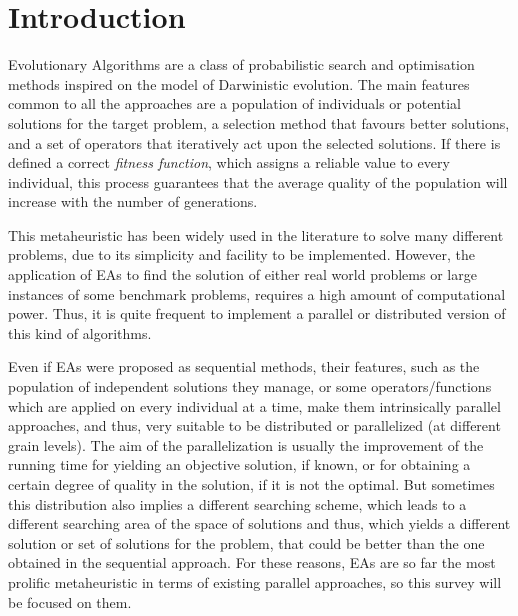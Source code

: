 \documentclass{article}
\begin{document}
%


\section{Introduction}
\label{sec:intro}

Evolutionary Algorithms \cite{EAs_Back96} are a class of probabilistic search and optimisation methods inspired on the model of Darwinistic evolution.
The main features common to all the approaches are a population of individuals or potential solutions for the target problem, a selection method that favours better solutions, and a set of operators that iteratively act upon the selected solutions. If there is defined a correct {\em fitness function}, which assigns a reliable value to every individual, this process guarantees that the average quality of the population will increase with the number of generations.

This metaheuristic has been widely used in the literature to solve many different problems, due to its simplicity and facility to be implemented. However, the application of EAs to find the solution of either real world problems or large instances of some benchmark problems, requires a high amount of computational power. Thus, it is quite frequent to implement a parallel or distributed version of this kind of algorithms.

Even if EAs were proposed as sequential methods, their features, such as the population of independent solutions they manage, or some operators/functions which are applied on every individual at a time, make them intrinsically parallel approaches, and thus, very suitable to be distributed or parallelized (at different grain levels).
The aim of the parallelization is usually the improvement of the running time for yielding an objective solution, if known, or for obtaining a certain degree of quality in the solution, if it is not the optimal. But sometimes this distribution also implies a different searching scheme, which leads to a different searching area of the space of solutions and thus, which yields a different solution or set of solutions for the problem, that could be better than the one obtained in the sequential approach.
For these reasons, EAs are so far the most prolific metaheuristic in
terms of existing parallel approaches, so this survey will be focused on them.
\end{document}
